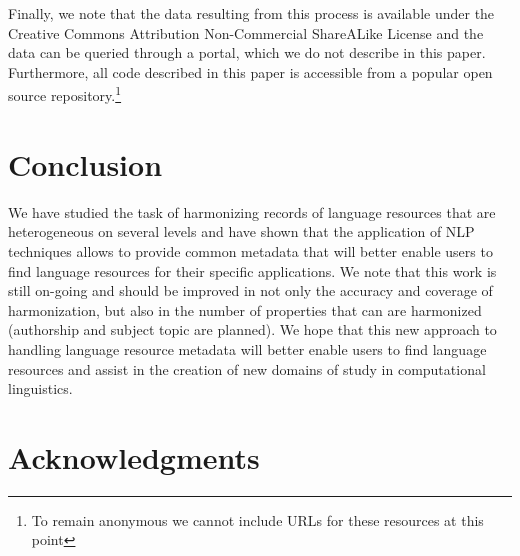 \documentclass[11pt]{article}
\begin{document}
Finally, we note that the data resulting from this process is available
under the Creative Commons Attribution Non-Commercial ShareALike License 
and the data can be queried through a portal, which we do not
describe in this paper. Furthermore, all
code described in this paper is accessible from a popular open source
repository.\footnote{To remain anonymous we cannot include URLs for these
resources at this point}

\section{Conclusion}

We have studied the task of harmonizing records of language resources that are
heterogeneous on several levels and have shown that the application of NLP
techniques allows to provide common metadata that will better enable users to
find language resources for their specific applications. We note that this work
is still on-going and should be improved in not only the accuracy and coverage
of harmonization, but also in the number of properties that can are harmonized
(authorship and subject topic are planned). We hope that this new
approach to handling language resource metadata will better enable users to find
language resources and assist in the creation of new domains of study in
computational linguistics.

\section*{Acknowledgments}

%



\end{document}
